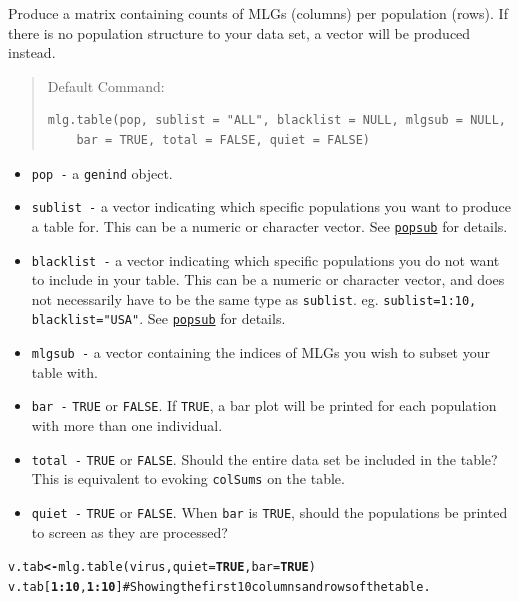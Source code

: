 \documentclass[letterpaper]{article}\usepackage[]{graphicx}\usepackage[]{color}
\makeatletter
\newcommand{\hlnum}[1]{\textcolor[rgb]{0.502,0,0.502}{\textbf{#1}}}%
\newcommand{\hlcom}[1]{\textcolor[rgb]{1,0.502,0}{#1}}%
\newcommand{\hlopt}[1]{\textcolor[rgb]{1,0,0.502}{\textbf{#1}}}%
\newcommand{\hlstd}[1]{\textcolor[rgb]{0,0,0}{#1}}%
\newcommand{\hlkwb}[1]{\textcolor[rgb]{0.502,0.502,0.753}{\textbf{#1}}}%
\newcommand{\hlkwc}[1]{\textcolor[rgb]{0,0.502,0.753}{#1}}%
\newcommand{\hlkwd}[1]{\textcolor[rgb]{0,0.267,0.4}{#1}}%
\newenvironment{kframe}{%
 \def\at@end@of@kframe{}%
 \ifinner\ifhmode%
  \def\at@end@of@kframe{\end{minipage}}%
  \begin{minipage}{\columnwidth}%
 \fi\fi%
 \def\FrameCommand##1{\hskip\@totalleftmargin \hskip-\fboxsep
 \colorbox{shadecolor}{##1}\hskip-\fboxsep
     \hskip-\linewidth \hskip-\@totalleftmargin \hskip\columnwidth}%
 \MakeFramed {\advance\hsize-\width
   \@totalleftmargin\z@ \linewidth\hsize
   \@setminipage}}%
 {\par\unskip\endMakeFramed%
 \at@end@of@kframe}
\newenvironment{knitrout}{}{} %
\newcommand{\tab}{\hspace*{1em}}
\newcommand{\cmdlink}[2]{
  \texttt{\hyperref[#1]{#2}}
}
\makeatother
\begin{document}
\tab\tab Produce a matrix containing counts of MLGs (columns) per population (rows). If there is no population structure to your data set, a vector will be produced instead.
\begin{quote}
Default Command:
\begin{knitrout}
\color{fgcolor}\begin{kframe}
\begin{verbatim}
mlg.table(pop, sublist = "ALL", blacklist = NULL, mlgsub = NULL, 
    bar = TRUE, total = FALSE, quiet = FALSE)
\end{verbatim}
\end{kframe}
\end{knitrout}

\end{quote}
  \begin{itemize}
    \item \texttt{pop -} a \texttt{genind} object.
    \item \texttt{sublist -} a vector indicating which specific populations you want to produce a table for. This can be a numeric or character vector. See\cmdlink{data.manip:divide:popsub}{popsub}for details.
    \item \texttt{blacklist -} a vector indicating which specific populations you do not want to include in your table. This can be a numeric or character vector, and does not necessarily have to be the same type as \texttt{sublist}. eg. \texttt{sublist=1:10, blacklist="USA"}. See\cmdlink{data.manip:divide:popsub}{popsub}for details.
    \item \texttt{mlgsub -} a vector containing the indices of MLGs you wish to subset your table with. 
    \item \texttt{bar -} \texttt{TRUE} or \texttt{FALSE}. If  \texttt{TRUE}, a bar plot will be printed for each population with more than one individual. 
    \item \texttt{total -} \texttt{TRUE} or \texttt{FALSE}. Should the entire data set be included in the table? This is equivalent to evoking \texttt{colSums} on the table.
    \item \texttt{quiet -} \texttt{TRUE} or \texttt{FALSE}. When \texttt{bar} is \texttt{TRUE}, should the populations be printed to screen as they are processed?
  \end{itemize}
\begin{knitrout}\footnotesize
{}\color{fgcolor}\begin{kframe}
\begin{alltt}
\hlstd{v.tab} \hlkwb{<-} \hlkwd{mlg.table}\hlstd{(virus,} \hlkwc{quiet} \hlstd{=} \hlnum{TRUE}\hlstd{,} \hlkwc{bar} \hlstd{=} \hlnum{TRUE}\hlstd{)}
\hlstd{v.tab[}\hlnum{1}\hlopt{:}\hlnum{10}\hlstd{,} \hlnum{1}\hlopt{:}\hlnum{10}\hlstd{]}  \hlcom{# Showing the first 10 columns and rows of the table.}
\end{alltt}
\end{kframe}
\end{knitrout}
\end{document}

